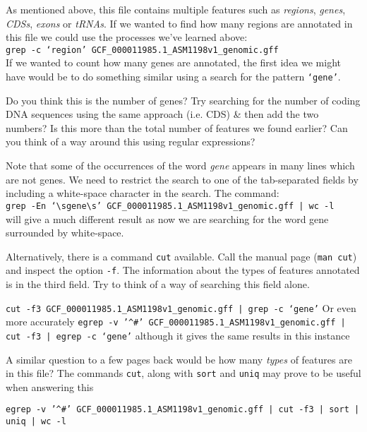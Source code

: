 \begin{bonus}
As mentioned above, this file contains multiple features such as \textit{regions}, \textit{genes}, \textit{CDSs}, \textit{exons} or \textit{tRNAs}.
If we wanted to find how many regions are annotated in this file we could use the processes we've learned above: \\
\texttt{grep -c `region' GCF\_000011985.1\_ASM1198v1\_genomic.gff} \\

If we wanted to count how many genes are annotated, the first idea we might have would be to do something similar using a search for the pattern \texttt{`gene'}. \\
\begin{questions}
Do you think this is the number of genes?
Try searching for the number of coding DNA sequences using the same approach (i.e. CDS) \& then add the two numbers?
Is this more than the total number of features we found earlier?
Can you think of a way around this using regular expressions?
\begin{answer}
Note that some of the occurrences of the word \textit{gene} appears in many lines which are not genes.
We need to restrict the search to one of the tab-separated fields by including a white-space character in the search.
The command:\\
\texttt{grep -En `\textbackslash sgene\textbackslash s' GCF\_000011985.1\_ASM1198v1\_genomic.gff | wc -l} \\
will give a much different result as now we are searching for the word gene surrounded by white-space.
\end{answer}

Alternatively, there is a command \texttt{cut} available.
Call the manual page (\texttt{man cut}) and inspect the option \texttt{-f}.
The information about the types of features annotated is in the third field.
Try to think of a way of searching this field alone.
\begin{answer}
\texttt{cut -f3 GCF\_000011985.1\_ASM1198v1\_genomic.gff | grep -c `gene'}
Or even more accurately
\texttt{egrep -v '\^{}\#' GCF\_000011985.1\_ASM1198v1\_genomic.gff | cut -f3 | egrep -c `gene'}
although it gives the same results in this instance
\end{answer}

A similar question to a few pages back would be how many \textit{types} of features are in this file?
The commands \texttt{cut}, along with \texttt{sort} and \texttt{uniq} may prove to be useful when answering this
\begin{answer}
\texttt{egrep -v '\^{}\#' GCF\_000011985.1\_ASM1198v1\_genomic.gff | cut -f3 | sort | uniq | wc -l}
\end{answer}

\end{questions}
\end{bonus}




